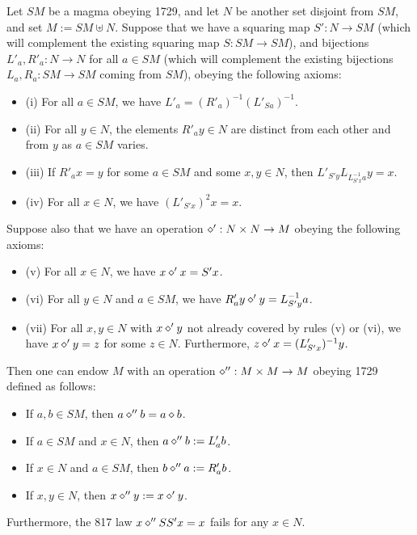 \begin{theorem}\label{mag}  Let $SM$ be a magma obeying 1729, and let $N$ be another set disjoint from $SM$, and set $M := SM \uplus N$.  Suppose that we have a squaring map $S': N \to SM$ (which will complement the existing squaring map $S: SM \to SM$), and bijections $L'_a, R'_a: N \to N$ for all $a \in SM$ (which will complement the existing bijections $L_a, R_a: SM \to SM$ coming from $SM$), obeying the following axioms:
  \begin{itemize}
  \item (i) For all $a \in SM$, we have $L'_a = (R'_a)^{-1} (L'_{Sa})^{-1}$.
  \item (ii) For all $y \in N$, the elements $R'_a y \in N$ are distinct from each other and from $y$ as $a \in SM$ varies.
  \item (iii)  If $R'_a x = y$ for some $a \in SM$ and some $x,y \in N$, then $L'_{S'y} L_{L_{S'x}^{-1} a} y = x$.
  \item (iv)  For all $x \in N$, we have $(L'_{S'x})^2 x = x$.
  \end{itemize}
Suppose also that we have an operation $\diamond': N \times N \to M$ obeying the following axioms:
\begin{itemize}
  \item (v)  For all $x \in N$, we have $x \diamond' x = S'x$.
  \item (vi)  For all $y \in N$ and $a \in SM$, we have $R'_a y \diamond' y = L_{S'y}^{-1} a$.
  \item (vii)  For all $x,y \in N$ with $x \diamond' y$ not already covered by rules (v) or (vi), we have $x \diamond' y = z$ for some $z \in N$.  Furthermore, $z \diamond' x = (L'_{S'x})^{-1} y$.
\end{itemize}
Then one can endow $M$ with an operation $\diamond'': M \times M \to M$ obeying 1729 defined as follows:
\begin{itemize}
\item  If $a,b \in SM$, then $a \diamond'' b = a \diamond b$.
\item  If $a \in SM$ and $x \in N$, then $a \diamond'' b := L'_a b$.
\item  If $x \in N$ and $a \in SM$, then $b \diamond'' a := R'_a b$.
\item  If $x,y \in N$, then $x \diamond'' y := x \diamond' y$.
\end{itemize}
Furthermore, the 817 law $x \diamond'' SS' x = x$ fails for any $x \in N$.
\end{theorem}

